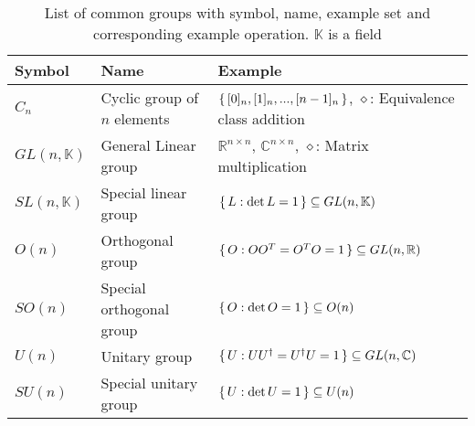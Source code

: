 			\begin{table}[ht]
				\begin{center}
				\begin{tabular}{ l | l | l }
					Symbol & Name & Example \\ \hline
					$C_n$ & Cyclic group of $n$ elements & $\set{[0]_n, [1]_n, ..., [n-1]_n}$, $\diamond$: Equivalence class addition \\
					$GL(n, \mathbb{K})$ & General Linear group & $\mathbb{R}^{n\times n}$, $\mathbb{C}^{n\times n}$, $\diamond$: Matrix multiplication \\
					$SL(n, \mathbb{K})$ & Special linear group & $\set{L: \det L = 1} \subseteq GL(n, \mathbb{K})$ \\
					$O(n)$ & Orthogonal group & $\set{O: OO^{T}=O^{T}O=1}\subseteq GL(n, \mathbb{R})$ \\
					$SO(n)$ & Special orthogonal group& $\set{O: \det O = 1}\subseteq O(n)$\\
					$U(n)$ & Unitary group & $\set{U: UU^{\dagger}=U^{\dagger}U=1}\subseteq GL(n, \mathbb{C})$ \\
					$SU(n)$ & Special unitary group & $\set{U: \det U = 1}\subseteq U(n)$ \\
					\end{tabular}
					\caption{List of common groups with symbol, name, example set and corresponding example operation. $\mathbb{K}$ is a field}
				\end{center}
			\end{table} \vsp


		